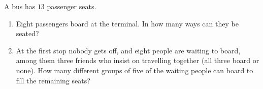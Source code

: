 A bus has $13$ passenger seats.
\begin{enumerate}
\item[(i)] Eight passengers board at the terminal. In how many ways can they be seated?
\item[(ii)] At the first stop nobody gets off, and eight people are waiting to board, among them three friends who insist on travelling together (all three board or none). How many different groups of five of the waiting people can board to fill the remaining seats?
\end{enumerate}
